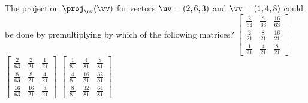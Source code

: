 \begin{activity}
The projection \(\proj_\uv(\vv)\) for vectors \(\uv=(2,6,3)\) and \(\vv=(1,4,8)\) could be done by premultiplying by which of the following matrices?
{\(\begin{bmatrix} \frac{2}{63}&\frac{8}{63}&\frac{16}{63}
\\\frac{2}{21}&\frac{8}{21}&\frac{16}{21}
\\\frac{1}{21}&\frac{4}{21}&\frac{8}{21} \end{bmatrix}\)}
{\(\begin{bmatrix} \frac{2}{63}&\frac{2}{21}&\frac{1}{21}
\\\frac{8}{63}&\frac{8}{21}&\frac{4}{21}
\\\frac{16}{63}&\frac{16}{21}&\frac{8}{21} \end{bmatrix}\)}{
\(\begin{bmatrix} \frac{1}{81}&\frac{4}{81}&\frac{8}{81}
\\\frac{4}{81}&\frac{16}{81}&\frac{32}{81}
\\\frac{8}{81}&\frac{32}{81}&\frac{64}{81} \end{bmatrix}\)}
\end{activity}





